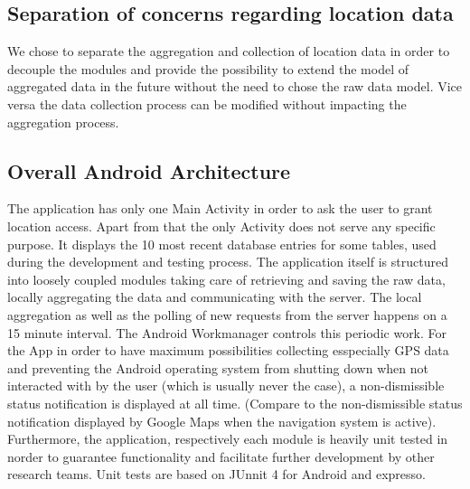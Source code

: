 \subsection{Separation of concerns regarding location data}
We chose to separate the aggregation and collection of location data in order to decouple the modules and provide the possibility to extend the model of aggregated data in the future without the need to chose the raw data model. Vice versa the data collection process can be modified without impacting the aggregation process.

\subsection{Overall Android Architecture}
The application has only one Main Activity in order to ask the user to grant location access. Apart from that the only Activity does not serve any specific purpose. It displays the 10 most recent database entries for some tables, used during the development and testing process.
The application itself is structured into loosely coupled modules taking care of retrieving and saving the raw data, locally aggregating the data and communicating with the server.
The local aggregation as well as the polling of new requests from the server happens on a 15 minute interval. The Android Workmanager controls this periodic work.
For the App in order to have maximum possibilities collecting esspecially GPS data and preventing the Android operating system from shutting down when not interacted with by the user (which is usually never the case), a non-dismissible status notification is displayed at all time. (Compare to the non-dismissible status notification displayed by Google Maps when the navigation system is active).
Furthermore, the application, respectively each module is heavily unit tested in norder to guarantee functionality and facilitate further development by other research teams. Unit tests are based on JUnnit 4 for Android and expresso.

